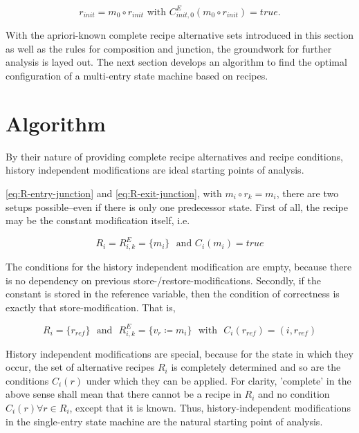 \documentclass[12pt,a4paper]{scrartcl}
\begin{document}
\begin{equation}
    r_{init} = m_0 \circ r_{init} \,\, \mbox{with} \,\, C^E_{init,0}(m_0\circ r_{init})=true.
\end{equation}

With the apriori-known complete recipe alternative sets introduced in this
section as well as the rules for composition and junction, the groundwork for
further analysis is layed out. The next section develops an algorithm to find
the optimal configuration of a multi-entry state machine based on recipes.

\section{Algorithm}

By their nature of providing complete recipe alternatives and recipe conditions,
history independent modifications are ideal starting points of analysis. 

\ref{eq:R-entry-junction} and \ref{eq:R-exit-junction}, with $m_i\circ
r_k=m_i$, there are two setups possible--even if there is only one predecessor
state. First of all, the recipe may be the constant modification itself, i.e.

\begin{equation} \label{eq:R-entry-junction}
    R_i = R^E_{i,k} = \{ m_i \} \,\,\mbox{ and } C_i(m_i) = true
\end{equation}

The conditions for the history independent modification are empty, because there 
is no dependency on previous store-/restore-modifications. Secondly, if the constant
is stored in the reference variable, then the condition of correctness is
exactly that store-modification. That is, 

\begin{equation} \label{eq:R-entry-junction}
    R_i = \{ r_{ref} \} \,\,\mbox{ and }  \,\, R^E_{i,k} = \{ v_r \coloneq m_i \}
                        \,\,\mbox{ with } \,\, C_i(r_{ref}) = (i, r_{ref})
\end{equation}

History independent modifications are special, because for the state in which they
occur, the set of alternative recipes $R_i$ is completely determined and so are
the conditions $C_i(r)$ under which they can be applied. For clarity,
'complete' in the above sense shall mean that there cannot be a recipe in $R_i$
and no condition $C_i(r)\forall r\in R_i$, except that it is known. Thus,
history-independent modifications in the single-entry state machine are the
natural starting point of analysis.
\end{document}
